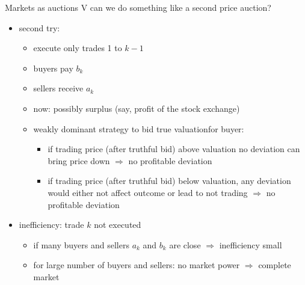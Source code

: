 \documentclass[bigger]{beamer}
\newcommand{\Ra}{\Rightarrow} \newcommand{\ra}{\rightarrow} \newcommand{\Lra}{\Leftrightarrow}
\begin{document}
\begin{frame}[label={sec:orgf137815}]{Markets as auctions V}
can we do something like a second price auction?
\begin{itemize}
\item second try:
\begin{itemize}
\item execute only trades 1 to \(k-1\)
\item buyers pay \(b_k\)
\item sellers receive \(a_k\)
\item now: possibly surplus (say, profit of the stock exchange)
\item weakly dominant strategy to bid true valuation\linebreak for buyer:
\begin{itemize}
\item if trading price (after truthful bid) above valuation no deviation can bring price down \(\Ra\) no profitable deviation
\item if trading price (after truthful bid) below valuation, any deviation would either not affect outcome or lead to not trading \(\Ra\) no profitable deviation
\end{itemize}
\end{itemize}
\item inefficiency: trade \(k\) not executed
\begin{itemize}
\item if many buyers and sellers \(a_k\) and \(b_k\) are close \(\Ra\) inefficiency small
\item for large number of buyers and sellers: no market power \(\Ra\) complete market
\end{itemize}
\end{itemize}
\end{frame}
\end{document}
